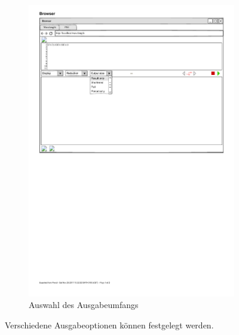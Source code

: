 \documentclass[parskip=full,11pt,twoside]{scrartcl}
\begin{document}
\begin{figure}[H]
\begin{subfigure}[r]{0.25\textwidth}
		\includegraphics{img/outputSizeMenu}
	\caption{Auswahl des Ausgabeumfangs}	
	\end{subfigure}
	\caption{\label{fig:outputOptions} Verschiedene Ausgabeoptionen können festgelegt werden.}
\end{figure}
\end{document}
